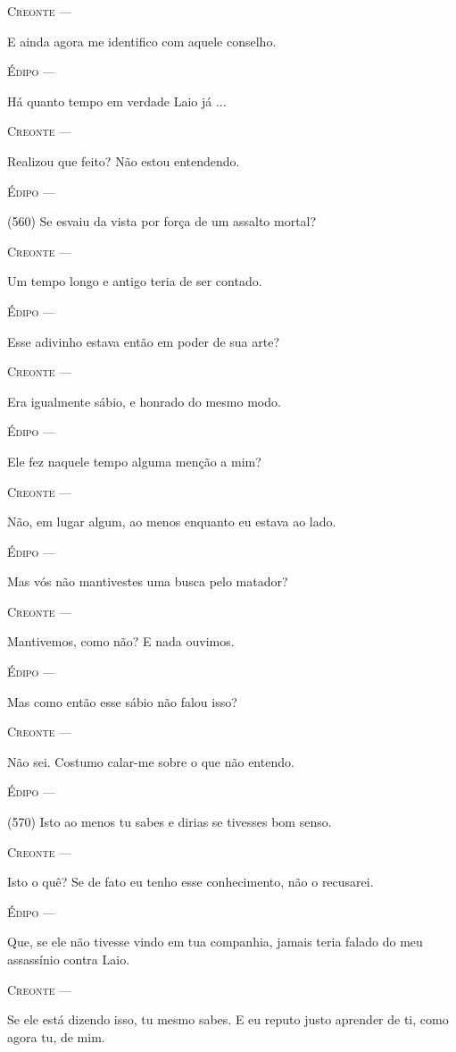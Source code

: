 \textsc{Creonte} ---

E ainda agora me identifico com aquele conselho.

\textsc{Édipo} ---

Há quanto tempo em verdade Laio já ...

\textsc{Creonte} ---

Realizou que feito? Não estou entendendo.

\textsc{Édipo} ---

(560) Se esvaiu da vista por força de um assalto mortal?

\textsc{Creonte} ---

Um tempo longo e antigo teria de ser contado.

\textsc{Édipo} ---

Esse adivinho estava então em poder de sua arte?

\textsc{Creonte} ---

Era igualmente sábio, e honrado do mesmo modo.

\textsc{Édipo} ---

Ele fez naquele tempo alguma menção a mim?

\textsc{Creonte} ---

Não, em lugar algum, ao menos enquanto eu estava ao lado.

\textsc{Édipo} ---

Mas vós não mantivestes uma busca pelo matador?

\textsc{Creonte} ---

Mantivemos, como não? E nada ouvimos.

\textsc{Édipo} ---

Mas como então esse sábio não falou isso?

\textsc{Creonte} ---

Não sei. Costumo calar-me sobre o que não entendo.

\textsc{Édipo} ---

(570) Isto ao menos tu sabes e dirias se tivesses bom senso.

\textsc{Creonte} ---

Isto o quê? Se de fato eu tenho esse conhecimento, não o recusarei.

\textsc{Édipo} ---

Que, se ele não tivesse vindo em tua companhia, jamais teria falado do
meu assassínio contra Laio.

\textsc{Creonte} ---

Se ele está dizendo isso, tu mesmo sabes. E eu reputo justo aprender de
ti, como agora tu, de mim.

